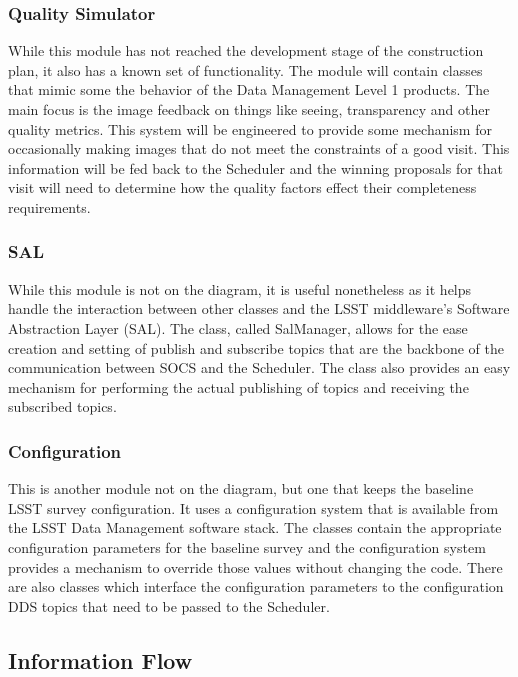 \documentclass[]{spie}  %
\begin{document}
\subsubsection{Quality Simulator}

While this module has not reached the development stage of the construction plan, it also has a known set of functionality. The module will contain classes that mimic some the behavior of the Data Management Level 1 products. The main focus is the image feedback on things like seeing, transparency and other quality metrics. This system will be engineered to provide some mechanism for occasionally making images that do not meet the constraints of a good visit. This information will be fed back to the Scheduler and the winning proposals for that visit will need to determine how the quality factors effect their completeness requirements.

\subsubsection{SAL}

While this module is not on the diagram, it is useful nonetheless as it helps handle the interaction between other classes and the LSST middleware's Software Abstraction Layer (SAL). The class, called SalManager, allows for the ease creation and setting of publish and subscribe topics that are the backbone of the communication between SOCS and the Scheduler. The class also provides an easy mechanism for performing the actual publishing of topics and receiving the subscribed topics.

\subsubsection{Configuration}

This is another module not on the diagram, but one that keeps  the baseline LSST survey configuration. It uses a configuration system that is available from the LSST Data Management software stack\cite{2015arXiv151207914J}. The classes contain the appropriate configuration parameters for the baseline survey and the configuration system provides a mechanism to override those values without changing the code. There are also classes which interface the configuration parameters to the configuration DDS topics that need to be passed to the Scheduler.

\subsection{Information Flow}
\end{document}
